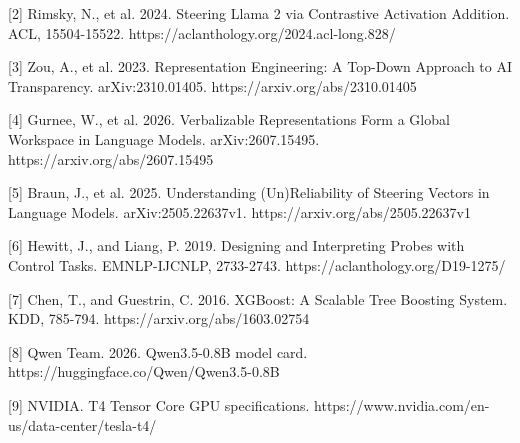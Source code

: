 \documentclass[10pt,twocolumn]{article}
\begin{document}
[2] Rimsky, N., et al. 2024. Steering Llama 2 via Contrastive Activation Addition. ACL, 15504-15522. https://aclanthology.org/2024.acl-long.828/

[3] Zou, A., et al. 2023. Representation Engineering: A Top-Down Approach to AI Transparency. arXiv:2310.01405. https://arxiv.org/abs/2310.01405

[4] Gurnee, W., et al. 2026. Verbalizable Representations Form a Global Workspace in Language Models. arXiv:2607.15495. https://arxiv.org/abs/2607.15495

[5] Braun, J., et al. 2025. Understanding (Un)Reliability of Steering Vectors in Language Models. arXiv:2505.22637v1. https://arxiv.org/abs/2505.22637v1

[6] Hewitt, J., and Liang, P. 2019. Designing and Interpreting Probes with Control Tasks. EMNLP-IJCNLP, 2733-2743. https://aclanthology.org/D19-1275/

[7] Chen, T., and Guestrin, C. 2016. XGBoost: A Scalable Tree Boosting System. KDD, 785-794. https://arxiv.org/abs/1603.02754

[8] Qwen Team. 2026. Qwen3.5-0.8B model card. https://huggingface.co/Qwen/Qwen3.5-0.8B

[9] NVIDIA. T4 Tensor Core GPU specifications. https://www.nvidia.com/en-us/data-center/tesla-t4/
\end{document}

